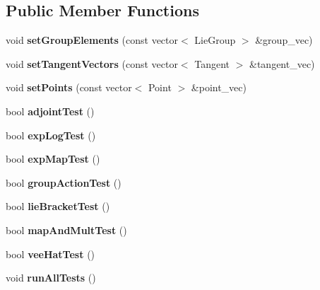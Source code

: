 \subsection*{Public Member Functions}
\begin{DoxyCompactItemize}
\item 
void {\bfseries set\+Group\+Elements} (const vector$<$ Lie\+Group $>$ \&group\+\_\+vec)\hypertarget{class_sophus_1_1_tests_aa556351b6ec42dbd798ccb2d89d25731}{}\label{class_sophus_1_1_tests_aa556351b6ec42dbd798ccb2d89d25731}

\item 
void {\bfseries set\+Tangent\+Vectors} (const vector$<$ Tangent $>$ \&tangent\+\_\+vec)\hypertarget{class_sophus_1_1_tests_ac56be32b9b622434bbb63daeba0d71f1}{}\label{class_sophus_1_1_tests_ac56be32b9b622434bbb63daeba0d71f1}

\item 
void {\bfseries set\+Points} (const vector$<$ Point $>$ \&point\+\_\+vec)\hypertarget{class_sophus_1_1_tests_a10e71031aad3a2b0f27f3c7e3910795d}{}\label{class_sophus_1_1_tests_a10e71031aad3a2b0f27f3c7e3910795d}

\item 
bool {\bfseries adjoint\+Test} ()\hypertarget{class_sophus_1_1_tests_a6ebb5699c186b1f8131328b61122b072}{}\label{class_sophus_1_1_tests_a6ebb5699c186b1f8131328b61122b072}

\item 
bool {\bfseries exp\+Log\+Test} ()\hypertarget{class_sophus_1_1_tests_adc3dd7283848ee5cb286c33b31555e27}{}\label{class_sophus_1_1_tests_adc3dd7283848ee5cb286c33b31555e27}

\item 
bool {\bfseries exp\+Map\+Test} ()\hypertarget{class_sophus_1_1_tests_a0aefd979ae1d238e5fa9cd0fbd6e8ca2}{}\label{class_sophus_1_1_tests_a0aefd979ae1d238e5fa9cd0fbd6e8ca2}

\item 
bool {\bfseries group\+Action\+Test} ()\hypertarget{class_sophus_1_1_tests_ad70372082f66ff29a4de6a8baec29fad}{}\label{class_sophus_1_1_tests_ad70372082f66ff29a4de6a8baec29fad}

\item 
bool {\bfseries lie\+Bracket\+Test} ()\hypertarget{class_sophus_1_1_tests_a7a2dcafc58820d3148785f90b5506e1b}{}\label{class_sophus_1_1_tests_a7a2dcafc58820d3148785f90b5506e1b}

\item 
bool {\bfseries map\+And\+Mult\+Test} ()\hypertarget{class_sophus_1_1_tests_af3b3f9c4af8180dba91900def4baafb4}{}\label{class_sophus_1_1_tests_af3b3f9c4af8180dba91900def4baafb4}

\item 
bool {\bfseries vee\+Hat\+Test} ()\hypertarget{class_sophus_1_1_tests_af49695637bd2a08bdd2583132c1b4399}{}\label{class_sophus_1_1_tests_af49695637bd2a08bdd2583132c1b4399}

\item 
void {\bfseries run\+All\+Tests} ()\hypertarget{class_sophus_1_1_tests_ae2f469f25d1a7478466480725be2cf97}{}\label{class_sophus_1_1_tests_ae2f469f25d1a7478466480725be2cf97}

\end{DoxyCompactItemize}
